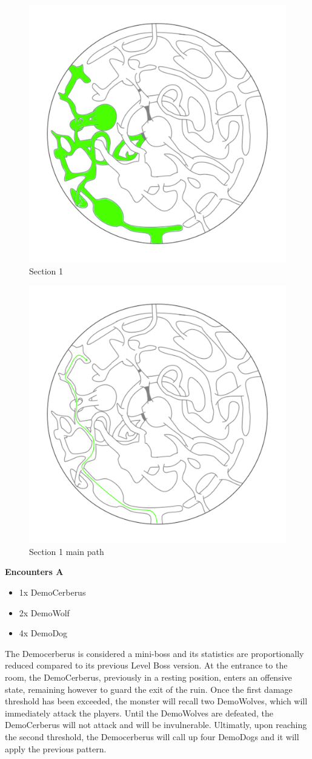 \begin{figure}[H]
	\centering
	\includegraphics[width=0.7\linewidth]{images/map/2D_map_section_01.png}
	\caption*{Section 1}
\end{figure}

\begin{figure}[H]
	\centering
	\includegraphics[width=0.7\linewidth]{images/map/map_principle_path_section_01.png}
	\caption*{Section 1 main path}
\end{figure}


\textbf{Encounters A}
\begin{itemize}
	\item 1x DemoCerberus
	\item 2x DemoWolf
	\item 4x DemoDog
\end{itemize}
The Democerberus is considered a mini-boss and its statistics are proportionally reduced compared to its previous Level Boss version. At the entrance to the room, the DemoCerberus, previously in a resting position, enters an offensive state, remaining however to guard the exit of the ruin. Once the first damage threshold has been exceeded, the monster will recall two DemoWolves, which will immediately attack the players. Until the DemoWolves are defeated, the DemoCerberus will not attack and will be invulnerable. Ultimatly, upon reaching the second threshold, the Democerberus will call up four DemoDogs and it will apply the previous pattern.\\

